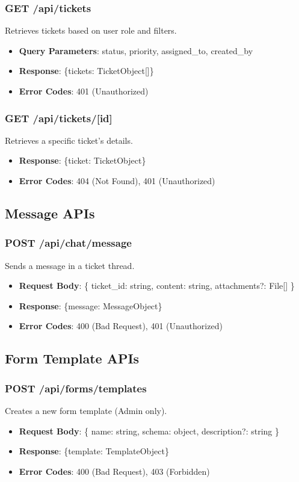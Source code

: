 \documentclass[12pt,a4paper]{article}
\begin{document}
\subsubsection{GET /api/tickets}
Retrieves tickets based on user role and filters.
\begin{itemize}
    \item \textbf{Query Parameters}: status, priority, assigned\_to, created\_by
    \item \textbf{Response}: \{tickets: TicketObject[]\}
    \item \textbf{Error Codes}: 401 (Unauthorized)
\end{itemize}

\subsubsection{GET /api/tickets/[id]}
Retrieves a specific ticket's details.
\begin{itemize}
    \item \textbf{Response}: \{ticket: TicketObject\}
    \item \textbf{Error Codes}: 404 (Not Found), 401 (Unauthorized)
\end{itemize}

\subsection{Message APIs}

\subsubsection{POST /api/chat/message}
Sends a message in a ticket thread.
\begin{itemize}
    \item \textbf{Request Body}: \{
        ticket\_id: string,
        content: string,
        attachments?: File[]
    \}
    \item \textbf{Response}: \{message: MessageObject\}
    \item \textbf{Error Codes}: 400 (Bad Request), 401 (Unauthorized)
\end{itemize}

\subsection{Form Template APIs}

\subsubsection{POST /api/forms/templates}
Creates a new form template (Admin only).
\begin{itemize}
    \item \textbf{Request Body}: \{
        name: string,
        schema: object,
        description?: string
    \}
    \item \textbf{Response}: \{template: TemplateObject\}
    \item \textbf{Error Codes}: 400 (Bad Request), 403 (Forbidden)
\end{itemize}
\end{document}
